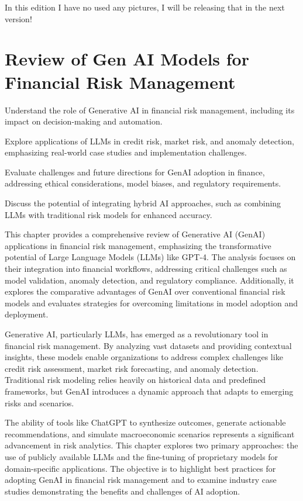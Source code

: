 \documentclass[a4paper,headinclude=on,footinclude=on,12pt,oneside]{scrbook}
\begin{document}
		In this edition I have no used any pictures, I will be releasing that in the  next version!  
	
	
	
	
	\chapter{Review of Gen AI Models for Financial Risk Management}
	
	\begin{arrows}
		\item Understand the role of Generative AI in financial risk management, including its impact on decision-making and automation.
		\item Explore applications of LLMs in credit risk, market risk, and anomaly detection, emphasizing real-world case studies and implementation challenges.
		\item Evaluate challenges and future directions for GenAI adoption in finance, addressing ethical considerations, model biases, and regulatory requirements.
		\item Discuss the potential of integrating hybrid AI approaches, such as combining LLMs with traditional risk models for enhanced accuracy.
	\end{arrows}
	
	This chapter provides a comprehensive review of Generative AI (GenAI) applications in financial risk management, emphasizing the transformative potential of Large Language Models (LLMs) like GPT-4. The analysis focuses on their integration into financial workflows, addressing critical challenges such as model validation, anomaly detection, and regulatory compliance. Additionally, it explores the comparative advantages of GenAI over conventional financial risk models and evaluates strategies for overcoming limitations in model adoption and deployment.
	
	
	Generative AI, particularly LLMs, has emerged as a revolutionary tool in financial risk management. By analyzing vast datasets and providing contextual insights, these models enable organizations to address complex challenges like credit risk assessment, market risk forecasting, and anomaly detection. Traditional risk modeling relies heavily on historical data and predefined frameworks, but GenAI introduces a dynamic approach that adapts to emerging risks and scenarios.
	
	The ability of tools like ChatGPT to synthesize outcomes, generate actionable recommendations, and simulate macroeconomic scenarios represents a significant advancement in risk analytics. This chapter explores two primary approaches: the use of publicly available LLMs and the fine-tuning of proprietary models for domain-specific applications. The objective is to highlight best practices for adopting GenAI in financial risk management and to examine industry case studies demonstrating the benefits and challenges of AI adoption.
	
\end{document}
